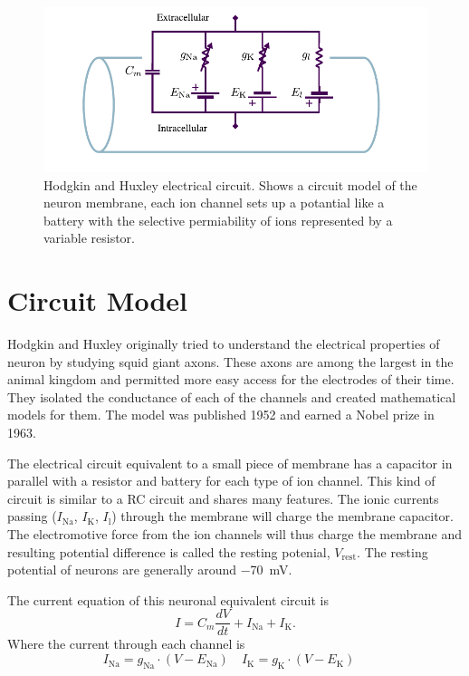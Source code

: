 \documentclass[altfont, fleqn]{uiophd}
\begin{document}
\begin{figure}[h]
    \centering
    \includegraphics[width=1.0\textwidth]{images/sec_2/compartment.pdf}
    \caption{Hodgkin and Huxley electrical circuit. 
    Shows a circuit model of the neuron membrane, each ion channel 
    sets up a potantial like a battery with the 
    selective permiability of ions represented by a variable resistor. 
    }
    \label{fig:2_hud_hux}
\end{figure}

\section{Circuit Model}
Hodgkin and Huxley originally tried to understand the
electrical properties of neuron by studying squid giant axons. 
These axons are among the largest in the animal kingdom
and permitted more easy access for the electrodes of their time. 
They isolated the conductance of each of the channels
and created mathematical models for them. 
The model was published 1952 and earned 
a Nobel prize in 1963. 

The electrical circuit equivalent to a small piece of membrane 
has a capacitor in parallel with a resistor and battery 
for each type of ion channel. 
This kind of circuit is similar to a RC circuit and
shares many features. 
The ionic currents passing 
($I_\text{Na}$, 
$I_\text{K}$, 
$I_\text{l}$) 
through the membrane will charge the membrane capacitor. 
The electromotive force from the ion channels will thus
charge the membrane and resulting potential difference 
is called the resting potenial, $V_\text{rest}$. 
The resting potential of neurons are generally around
\SI{-70}{\milli\volt}. 

The current equation of this neuronal equivalent circuit is
\begin{equation} \label{eq:hux_current_eq}
I = C_m \frac{dV}{dt} + I_\text{Na} + I_\text{K}.
\end{equation}
Where the current through each channel is 
\begin{equation} 
    I_\text{Na} = g_\text{Na} \cdot (V - E_\text{Na}) \quad
    I_\text{K} = g_\text{K}  \cdot (V - E_\text{K}) \quad
\end{equation}
\end{document}
